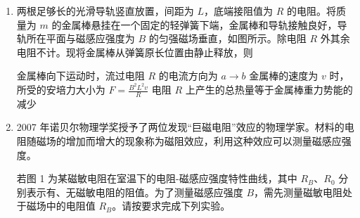 \documentclass[\gkver]{gaokaozhenti}
\begin{document}
\begin{enumerate}

{$D$ 点电场强度为零}
{若将点电荷 $+q$ 从 $O$ 移向 $C$，电势能增大}
{若将点电荷 $-q$ 从 $O$ 移向 $C$，电势能增大}


\item
两根足够长的光滑导轨竖直放置，间距为 $L$，底端接阻值为 $R$ 的电阻。将质量为 $m$ 的金属棒悬挂在一个固定的轻弹簧下端，金属棒和导轨接触良好，导轨所在平面与磁感应强度为 $B$ 的匀强磁场垂直，如图所示。除电阻 $R$ 外其余电阻不计。现将金属棒从弹簧原长位置由静止释放，则


{金属棒向下运动时，流过电阻 $R$ 的电流方向为 $a\to b$}
{金属棒的速度为 $v$ 时，所受的安培力大小为 $F=\frac{B^{2}L^{2}v}{R}$}
{电阻 $R$ 上产生的总热量等于金属棒重力势能的减少}


\item
2007 年诺贝尔物理学奖授予了两位发现“巨磁电阻”效应的物理学家。材料的电阻随磁场的增加而增大的现象称为磁阻效应，利用这种效应可以测量磁感应强度。

若图 1 为某磁敏电阻在室温下的电阻-磁感应强度特性曲线，其中 $R_{B}$、$R_{0}$ 分别表示有、无磁敏电阻的阻值。为了测量磁感应强度 $B$，需先测量磁敏电阻处于磁场中的电阻值 $R_{B}$。请按要求完成下列实验。


\end{enumerate}
\end{document}

